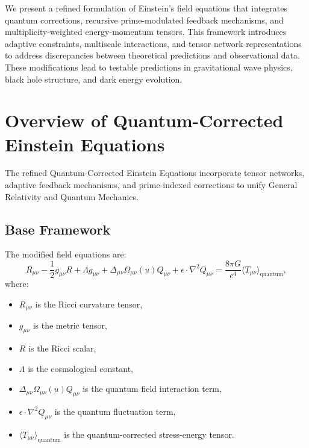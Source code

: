 \documentclass[12]{amsart}
\theoremstyle{plain}
\begin{document}
We present a refined formulation of Einstein's field equations that integrates quantum corrections, recursive prime-modulated feedback mechanisms, and multiplicity-weighted energy-momentum tensors. This framework introduces adaptive constraints, multiscale interactions, and tensor network representations to address discrepancies between theoretical predictions and observational data. These modifications lead to testable predictions in gravitational wave physics, black hole structure, and dark energy evolution.


\section{Overview of Quantum-Corrected Einstein Equations}
The refined Quantum-Corrected Einstein Equations incorporate tensor networks, adaptive feedback mechanisms, and prime-indexed corrections to unify General Relativity and Quantum Mechanics.

\subsection{Base Framework}
The modified field equations are:
\begin{equation}
    R_{\mu\nu} - \frac{1}{2} g_{\mu\nu} R + \Lambda g_{\mu\nu} + \Delta_{\mu\nu} \Omega_{\mu\nu}(u) Q_{\mu\nu} + \epsilon \cdot \nabla^2 Q_{\mu\nu} = \frac{8 \pi G}{c^4} \langle T_{\mu\nu} \rangle_{\text{quantum}},
\end{equation}
where:
\begin{itemize}
    \item \( R_{\mu\nu} \) is the Ricci curvature tensor,
    \item \( g_{\mu\nu} \) is the metric tensor,
    \item \( R \) is the Ricci scalar,
    \item \( \Lambda \) is the cosmological constant,
    \item \( \Delta_{\mu\nu} \Omega_{\mu\nu}(u) Q_{\mu\nu} \) is the quantum field interaction term,
    \item \( \epsilon \cdot \nabla^2 Q_{\mu\nu} \) is the quantum fluctuation term,
    \item \( \langle T_{\mu\nu} \rangle_{\text{quantum}} \) is the quantum-corrected stress-energy tensor.
\end{itemize}
\end{document}
